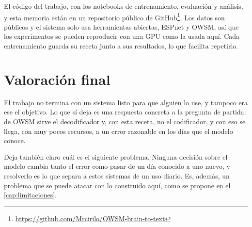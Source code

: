 El código del trabajo, con los notebooks de entrenamiento, evaluación y análisis, y esta memoria están en un repositorio público de GitHub\footnote{\url{https://github.com/Mrcirilo/OWSM-brain-to-text}}. Los datos son públicos \cite{b2t25} y el sistema solo usa herramientas abiertas, ESPnet y OWSM, así que los experimentos se pueden reproducir con una GPU como la usada aquí. Cada entrenamiento guarda su receta junto a sus resultados, lo que facilita repetirlo.

\section{Valoración final}

El trabajo no termina con un sistema listo para que alguien lo use, y tampoco era ese el objetivo. Lo que sí deja es una respuesta concreta a la pregunta de partida: de OWSM sirve el decodificador y, con esta receta, no el codificador, y con eso se llega, con muy pocos recursos, a un error razonable en los días que el modelo conoce.

Deja también claro cuál es el siguiente problema. Ninguna decisión sobre el modelo cambia tanto el error como pasar de un día conocido a uno nuevo, y resolverlo es lo que separa a estos sistemas de un uso diario. Es, además, un problema que se puede atacar con lo construido aquí, como se propone en el \cref{cap:limitaciones}.
